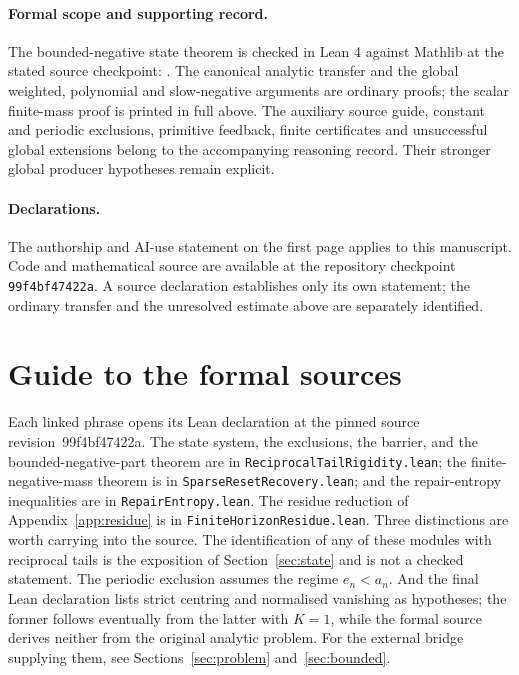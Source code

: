 \documentclass[11pt]{article}
\renewcommand{\commitshort}{99f4bf47422a}
\begin{document}
\paragraph{Formal scope and supporting record.}
The bounded-negative state theorem is checked in Lean 4 against Mathlib
at the stated source checkpoint:
.
The canonical analytic transfer and the global weighted, polynomial and
slow-negative arguments are ordinary proofs; the scalar finite-mass proof
is printed in full above. The auxiliary source guide, constant and periodic
exclusions, primitive feedback, finite certificates and unsuccessful global
extensions belong to the accompanying reasoning record. Their stronger
global producer hypotheses remain explicit.

\paragraph{Declarations.}
The authorship and AI-use statement on the first page applies to this
manuscript. Code and mathematical source are available at the repository
checkpoint \texttt{\commitshort}. A source declaration establishes only
its own statement; the ordinary transfer and the unresolved estimate above
are separately identified.

\appendix
\section{Guide to the formal sources}\label{app:index}

Each linked phrase opens its Lean declaration at the pinned source
revision~\commitshort.  The state system, the exclusions, the barrier, and the
bounded-negative-part theorem are in \texttt{ReciprocalTailRigidity.lean}; the
finite-negative-mass theorem is in \texttt{SparseResetRecovery.lean}; and the
repair-entropy inequalities are in \texttt{RepairEntropy.lean}.  The residue
reduction of Appendix~\ref{app:residue} is in
\texttt{FiniteHorizonResidue.lean}.  Three distinctions are worth carrying into
the source.  The
identification of any of these modules with reciprocal tails is the exposition
of Section~\ref{sec:state} and is not a checked statement.  The periodic exclusion
assumes the regime $e_n<a_n$.  And the final Lean declaration lists strict
centring and normalised vanishing as hypotheses; the former follows eventually
from the latter with $K=1$, while the formal source derives neither from the
original analytic problem.  For the external bridge supplying them,
see Sections~\ref{sec:problem} and~\ref{sec:bounded}.
\end{document}
